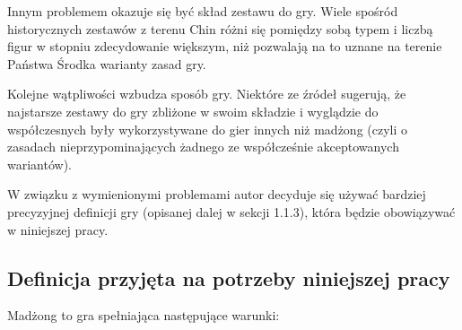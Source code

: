 Innym problemem okazuje się być skład zestawu do gry. Wiele spośród
historycznych zestawów z terenu Chin różni się pomiędzy sobą typem i liczbą
figur w stopniu zdecydowanie większym, niż pozwalają na to uznane na terenie
Państwa Środka warianty zasad gry.

Kolejne wątpliwości wzbudza sposób gry. Niektóre ze źródeł sugerują, że
najstarsze zestawy do gry zbliżone w swoim składzie i wyglądzie do współczesnych
były wykorzystywane do gier innych niż madżong (czyli o zasadach
nieprzypominających żadnego ze współcześnie akceptowanych wariantów).

W związku z wymienionymi problemami autor decyduje się używać bardziej
precyzyjnej definicji gry (opisanej dalej w sekcji 1.1.3), która będzie
obowiązywać w niniejszej pracy.
\subsection{Definicja przyjęta na potrzeby niniejszej pracy}
Madżong to gra spełniająca %
następujące warunki:

